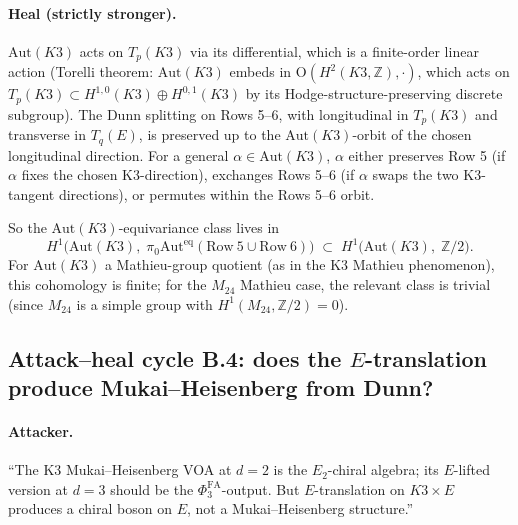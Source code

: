 \documentclass[11pt]{article}
\newcommand{\Etwo}{E_{2}}
\newcommand{\PhiFA}{\Phi^{\mathrm{FA}}}
\newcommand{\Z}{\mathbb{Z}}
\newcommand{\Aut}{\mathrm{Aut}}
\newcommand{\Auteq}{\mathrm{Aut}^{\mathrm{eq}}}
\begin{document}
\paragraph{Heal (strictly stronger).}
$\Aut(K3)$ acts on $T_p(K3)$ via its differential, which is a
finite-order linear action (Torelli theorem: $\Aut(K3)$ embeds in
$\mathrm{O}(H^2(K3, \Z), \cdot)$, which acts on $T_p(K3) \subset
H^{1,0}(K3) \oplus H^{0,1}(K3)$ by its Hodge-structure-preserving
discrete subgroup). The Dunn splitting on Rows 5--6, with longitudinal
in $T_p(K3)$ and transverse in $T_q(E)$, is preserved up to the
$\Aut(K3)$-orbit of the chosen longitudinal direction. For a general
$\alpha \in \Aut(K3)$, $\alpha$ either preserves Row 5 (if $\alpha$ fixes
the chosen K3-direction), exchanges Rows 5--6 (if $\alpha$ swaps the two
K3-tangent directions), or permutes within the Rows 5--6 orbit.

So the $\Aut(K3)$-equivariance class lives in
\[
  H^1\bigl(\Aut(K3),\; \pi_0 \Auteq(\mathrm{Row}\ 5 \cup \mathrm{Row}\ 6)\bigr)
  \;\subset\;
  H^1\bigl(\Aut(K3),\; \Z/2\bigr).
\]
For $\Aut(K3)$ a Mathieu-group quotient (as in the K3 Mathieu
phenomenon), this cohomology is finite; for the $M_{24}$ Mathieu case,
the relevant class is trivial (since $M_{24}$ is a simple group with
$H^1(M_{24}, \Z/2) = 0$).

\subsection{Attack--heal cycle B.4: does the $E$-translation produce
  Mukai--Heisenberg from Dunn?}

\paragraph{Attacker.}
``The K3 Mukai--Heisenberg VOA at $d = 2$ is the $\Etwo$-chiral algebra;
its $E$-lifted version at $d = 3$ should be the $\PhiFA_3$-output. But
$E$-translation on $K3 \times E$ produces a chiral boson on $E$, not a
Mukai--Heisenberg structure.''
\end{document}
